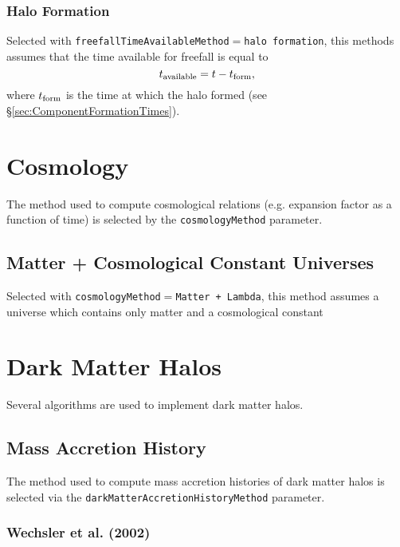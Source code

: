 \subsubsection{Halo Formation}

Selected with {\tt freefallTimeAvailableMethod}$=${\tt halo formation}, this methods assumes that the time available for freefall is equal to
\begin{equation}
 t_{\rm available} = t - t_{\rm form},
\end{equation}
where $t_{\rm form}$ is the time at which the halo formed (see \S\ref{sec:ComponentFormationTimes}).

\section{Cosmology}

The method used to compute cosmological relations (e.g. expansion factor as a function of time) is selected by the {\tt cosmologyMethod} parameter.

\subsection{Matter + Cosmological Constant Universes}

Selected with {\tt cosmologyMethod}$=${\tt Matter + Lambda}, this method assumes a universe which contains only matter and a cosmological constant

\section{Dark Matter Halos}

Several algorithms are used to implement dark matter halos.

\subsection{Mass Accretion History}

The method used to compute mass accretion histories of dark matter halos is selected via the {\tt darkMatterAccretionHistoryMethod} parameter.

\subsubsection{Wechsler et al. (2002)}

